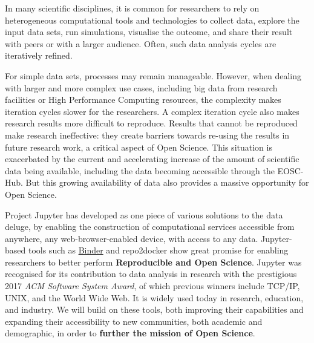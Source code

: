 

\begin{draft}

In many scientific disciplines, it is common for researchers to rely on
heterogeneous computational tools and technologies to collect data, explore the
input data sets, run simulations, visualise the outcome, and share their result
with peers or with a larger audience. Often, such data analysis cycles are
iteratively refined.

For simple data sets, processes may remain manageable. However, when dealing with
larger and more complex use cases, including big data from research facilities
or High Performance Computing resources, the complexity makes iteration cycles
slower for the researchers. A complex iteration cycle also makes research
results more difficult to reproduce. Results that cannot be reproduced make
research ineffective: they create barriers towards re-using the results in
future research work, a critical aspect of Open Science. This situation is
exacerbated by the current and accelerating increase of the amount of scientific
data being available, including the data becoming accessible through the
EOSC-Hub. But this growing availability of data also provides a massive
opportunity for Open Science.

Project Jupyter has developed as one piece of various solutions to the data
deluge, by enabling the construction of computational services accessible from
anywhere, any web-browser-enabled device, with access to any data. Jupyter-based
tools such as \href{https://mybinder.org}{Binder} and repo2docker show great
promise for enabling researchers to better perform \textbf{Reproducible and Open
  Science}. Jupyter was recognised for its contribution to data analysis in
research with the prestigious 2017 \emph{ACM Software System Award}, of which
previous winners include TCP/IP, UNIX, and the World Wide Web. It is widely used
today in research, education, and industry. We will build on these tools, both
improving their capabilities and expanding their accessibility to new
communities, both academic and demographic, in order to \textbf{further the
  mission of Open Science}.


\end{draft}
